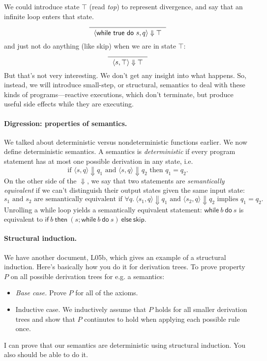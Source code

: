 \documentclass[11pt]{article}
\begin{document}
We could introduce state $\top$ (read \emph{top}) to represent divergence, and say that an infinite loop enters that state.
\[
\begin{prooftree}
  \infer0{~~\langle \mathsf{while} ~\mathsf{true}~ \mathsf{do} ~s,q\rangle \Downarrow \top~~}
\end{prooftree}
\]
and just not do anything (like \textsf{skip}) when we are in state $\top$:
\[
\begin{prooftree}
  \infer0{~~\langle s, \top \rangle \Downarrow \top~~}
\end{prooftree}
\]
But that's not very interesting. We don't get any insight into what happens.
So, instead, we will introduce small-step, or structural, semantics to deal
with these kinds of programs---reactive executions, which don't terminate,
but produce useful side effects while they are executing.

\paragraph{Digression: properties of semantics.} We talked about deterministic versus nondeterministic functions earlier. We now define deterministic semantics. A semantics is \emph{deterministic} if every program statement has at most one possible derivation in any state, i.e.
\[ \mbox{if } \langle s, q \rangle \Downarrow q_1 \mbox{ and } \langle s, q \rangle \Downarrow q_2 \mbox{ then } q_1 = q_2. \]
On the other side of the $\Downarrow$, we say that two statements are \emph{semantically equivalent} if we can't distinguish their output states given the same input state:
\[ s_1 \mbox{ and } s_2 \mbox{ are semantically equivalent if } \forall q.~ \langle s_1, q \rangle \Downarrow q_1 \mbox{ and } \langle s_2, q \rangle \Downarrow q_2 \mbox{ implies } q_1 = q_2. \]
Unrolling a while loop yields a semantically equivalent statement: $\mathsf{while} ~b~ \mathsf{do} ~s$ is equivalent to $\mathsf{if } ~b~ \mathsf{then~} (s; \mathsf{while} ~b~ \mathsf{do} ~s)~ \mathsf{else~skip}$.

\paragraph{Structural induction.} We have another document, L05b, which gives an example of a structural induction. Here's basically how you do it for derivation trees. To prove property $P$ on all possible derivation trees for e.g. a semantics:
\begin{itemize}[noitemsep]
\item \emph{Base case.} Prove $P$ for all of the axioms.
\item {Inductive case.} We inductively assume that $P$ holds for all smaller derivation trees and show that $P$ continutes to hold when applying each possible rule once.
\end{itemize}
I can prove that our semantics are deterministic using structural induction.
You also should be able to do it.
\end{document}

